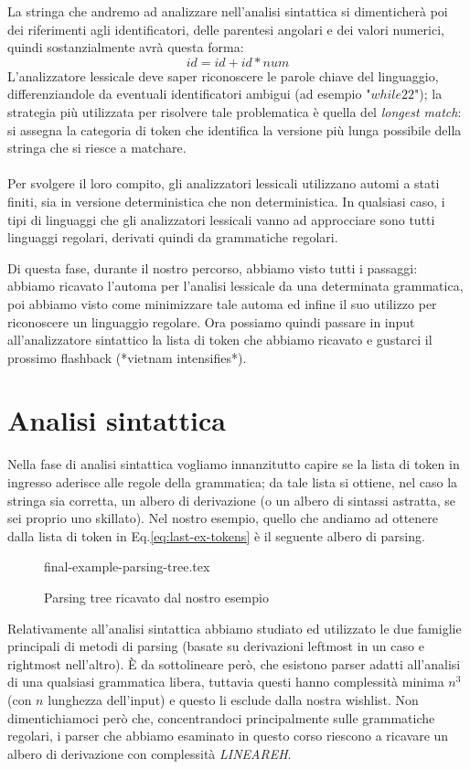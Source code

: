 \documentclass[class=book, crop=false, oneside, 12pt]{standalone}
\begin{document}
La stringa che andremo ad analizzare nell'analisi sintattica si dimenticherà poi dei riferimenti agli identificatori, delle parentesi angolari e dei valori numerici, quindi sostanzialmente avrà questa forma:
\begin{equation}
    id = id + id * num
\end{equation}
L'analizzatore lessicale deve saper riconoscere le parole chiave del linguaggio, differenziandole da eventuali identificatori ambigui (ad esempio "\(while22\)"); la strategia più utilizzata per risolvere tale problematica è quella del \emph{longest match}: si assegna la categoria di token che identifica la versione più lunga possibile della stringa che si riesce a matchare.
\\\\
Per svolgere il loro compito, gli analizzatori lessicali utilizzano automi a stati finiti, sia in versione deterministica che non deterministica.
In qualsiasi caso, i tipi di linguaggi che gli analizzatori lessicali vanno ad approcciare sono tutti linguaggi regolari, derivati quindi da grammatiche regolari.

Di questa fase, durante il nostro percorso, abbiamo visto tutti i passaggi: abbiamo ricavato l'automa per l'analisi lessicale da una determinata grammatica, poi abbiamo visto come minimizzare tale automa ed infine il suo utilizzo per riconoscere un linguaggio regolare.
Ora possiamo quindi passare in input all'analizzatore sintattico la lista di token che abbiamo ricavato e gustarci il prossimo flashback (*vietnam intensifies*). 

\section{Analisi sintattica}
Nella fase di analisi sintattica vogliamo innanzitutto capire se la lista di token in ingresso aderisce alle regole della grammatica; da tale lista si ottiene, nel caso la stringa sia corretta, un albero di derivazione (o un albero di sintassi astratta, se sei proprio uno skillato).
Nel nostro esempio, quello che andiamo ad ottenere dalla lista di token in Eq.\ref{eq:last-ex-tokens} è il seguente albero di parsing.
\begin{figure}[H]
    \centering
    {final-example-parsing-tree.tex}
    \caption{Parsing tree ricavato dal nostro esempio}
    \label{fig:last-ex-parse-tree}
\end{figure}
Relativamente all'analisi sintattica abbiamo studiato ed utilizzato le due famiglie principali di metodi di parsing (basate su derivazioni leftmost in un caso e rightmost nell'altro). 
È da sottolineare però, che esistono parser adatti all'analisi di una qualsiasi grammatica libera, tuttavia questi hanno complessità minima \(n^3\) (con \(n\) lunghezza dell'input) e questo li esclude dalla nostra wishlist.
Non dimentichiamoci però che, concentrandoci principalmente sulle grammatiche regolari, i parser che abbiamo esaminato in questo corso riescono a ricavare un albero di derivazione con complessità \emph{LINEAREH}.
\end{document}
